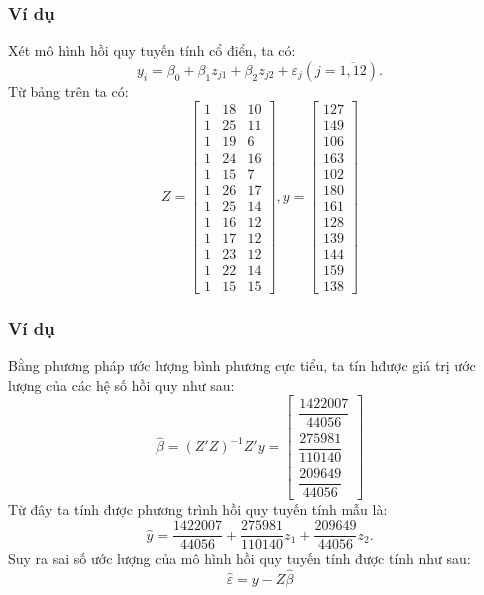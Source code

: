 \begin{frame}
\frametitle{Ví dụ}
Xét mô hình hồi quy tuyến tính cổ điển, ta có: 
\[
y_i = \beta_0 + \beta_1z_{j1} + \beta_2z_{j2} + \varepsilon_j (j=\overline{1,12}).
\]
Từ bảng trên ta có:\\
\[
Z = \begin{bmatrix}
1 & 18 & 10 \\
1 & 25 & 11 \\
1 & 19 & 6 \\
1 & 24 & 16 \\
1 & 15 & 7 \\
1 & 26 & 17 \\
1 & 25 & 14 \\
1 & 16 & 12 \\
1 & 17 & 12 \\
1 & 23 & 12 \\
1 & 22 & 14 \\
1 & 15 & 15
\end{bmatrix}, y = \begin{bmatrix}
    127 \\ 149 \\ 106 \\ 163\\ 102 \\ 180\\ 161\\128\\139\\144\\159\\138
\end{bmatrix}
\]
\end{frame}
\begin{frame}
\frametitle{Ví dụ}
Bằng phương pháp ước lượng bình phương cực tiểu, ta tín hđược giá trị ước lượng của các hệ số hồi quy
 như sau:\\
 \[
 \widehat{\beta} = (Z'Z)^{-1}Z'y = \begin{bmatrix}
     \dfrac{1422007}{44056}\\[0,5cm] \dfrac{275981}{110140}\\[0,5cm] \dfrac{209649}{44056}
 \end{bmatrix}
 \]
 Từ đây ta tính được phương trình hồi quy tuyến tính mẫu là:
 \[
 \widehat{y} = \dfrac{1422007}{44056} + \dfrac{275981}{110140}z_1 + \dfrac{209649}{44056}z_2.
 \]
 Suy ra sai số ước lượng của mô hình hồi quy tuyến tính được tính như sau: 
 \[
 \widehat{\varepsilon} = y - Z\widehat{\beta}
 \]
\end{frame}
